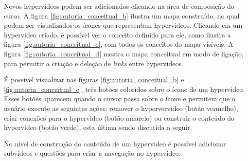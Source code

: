 Novos hypervideos podem ser adicionados clicando na área de composição do curso. A figura \ref{fig:autoria_conceitual_b} ilustra um mapa construído, no qual podem ser visualizados os ícones que representam hypervideos. Clicando em um hypervideo criado, é possível ver o conceito definido para ele, como ilustra a figura \ref{fig:autoria_conceitual_c}, com todos os conceitos do mapa visíveis. A figura \ref{fig:autoria_conceitual_d}  mostra o mapa conceitual em modo de ligação, para permitir a criação e deleção de \textit{links} entre hypervideos.

É possível visualizar nas figuras \ref{fig:autoria_conceitual_b} e \ref{fig:autoria_conceitual_c}, três botões coloridos sobre o ícone de um hypervideo. Esses botões aparecem quando o cursor passa sobre o ícone e permitem que o usuário execute as seguintes ações: remover o hypervervídeo (botão vermelho), criar conexões para o hypervideo (botão amarelo) ou construir o conteúdo do hypervídeo (botão verde), esta última sendo discutida a seguir. 

No nível de construção do conteúdo de um hypervideo é possível adicionar subvídeos e questões para criar a navegação no hypervideo. 

